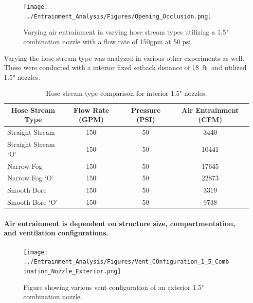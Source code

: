 \documentclass{article}
\begin{document}
\begin{figure}[!ht]
	\centering
	\texttt{[image: ../Entrainment\_Analysis/Figures/Opening\_Occlusion.png]}
	\caption{Varying air entrainment in varying hose stream types utilizing a 1.5" combination nozzle with a flow rate of 150gpm at 50 psi.}
	\label{fig:Opening_Occlusion}
\end{figure}

Varying the hose stream type was analyzed in various other experiments as well. These were conducted with a interior fixed setback distance of 18~ft. and utilized 1.5" nozzles.


\begin{table}[!ht]
\centering
\begin{tabular}{|lccc|}
\hline
\multicolumn{1}{|c|}{\textbf{Hose Stream Type}} & \multicolumn{1}{c|}{\textbf{Flow Rate (GPM)}} & \multicolumn{1}{c|}{\textbf{Pressure (PSI)}} & \textbf{Air Entrainment (CFM)} \\ \hline
Straight Stream & 150 & 50 & 3440 \\
Straight Stream `O' & 150 & 50 & 10441 \\
Narrow Fog & 150 & 50 & 17645 \\
Narrow Fog `O' & 150 & 50 & 22873 \\
Smooth Bore & 150 & 50 & 3319 \\
Smooth Bore `O' & 150 & 50 & 9738 \\ \hline
\end{tabular}
\caption{Hose stream type comparison for interior 1.5" nozzles.}
\label{Hose_Stream_Type_Comparison}
\end{table}

\clearpage

\paragraph{Air entrainment is dependent on structure size, compartmentation, and ventilation configurations.} \mbox{}

\begin{figure}[!ht]
	\centering
	\texttt{[image: ../Entrainment\_Analysis/Figures/Vent\_COnfiguration\_1\_5\_Combination\_Nozzle\_Exterior.png]}
	\caption{Figure showing various vent configuration of an exterior 1.5" combination nozzle.}
	\label{fig:1_5_Exterior_Vent_Configuration_Combination_Comparison}
\end{figure}
\end{document}
